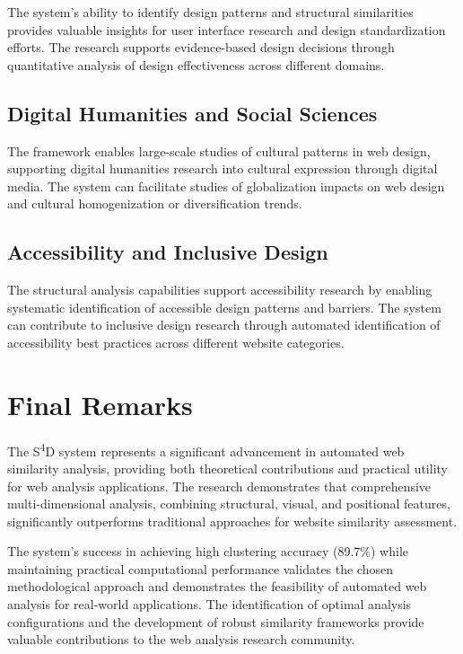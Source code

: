 The system's ability to identify design patterns and structural similarities provides valuable insights for user interface research and design standardization efforts. The research supports evidence-based design decisions through quantitative analysis of design effectiveness across different domains.

\subsection{Digital Humanities and Social Sciences}
\label{subsec-digital-humanities}

The framework enables large-scale studies of cultural patterns in web design, supporting digital humanities research into cultural expression through digital media. The system can facilitate studies of globalization impacts on web design and cultural homogenization or diversification trends.

\subsection{Accessibility and Inclusive Design}
\label{subsec:accessibility-impact}

The structural analysis capabilities support accessibility research by enabling systematic identification of accessible design patterns and barriers. The system can contribute to inclusive design research through automated identification of accessibility best practices across different website categories.

\section{Final Remarks}
\label{sec:final-remarks}

The S\textsuperscript{4}D system represents a significant advancement in automated web similarity analysis, providing both theoretical contributions and practical utility for web analysis applications. The research demonstrates that comprehensive multi-dimensional analysis, combining structural, visual, and positional features, significantly outperforms traditional approaches for website similarity assessment.

The system's success in achieving high clustering accuracy (89.7\%) while maintaining practical computational performance validates the chosen methodological approach and demonstrates the feasibility of automated web analysis for real-world applications. The identification of optimal analysis configurations and the development of robust similarity frameworks provide valuable contributions to the web analysis research community.

